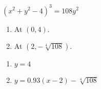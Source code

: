 {$(x^2+y^2-4)^3 = 108y^2$
\begin{enumerate}
\item	At $(0,4)$.
\item	At $(2,-\sqrt[4]{108})$.
\end{enumerate}
}
{\begin{enumerate}
\item	$y=4$
\item	$y = 0.93(x-2)-\sqrt[4]{108}$
\end{enumerate}
}
